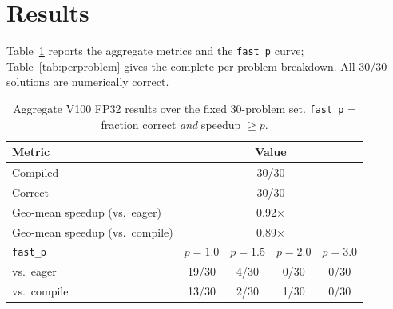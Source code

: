 \documentclass[conference]{IEEEtran}
\begin{document}
\section{Results}
Table~\ref{tab:aggregate} reports the aggregate metrics and the \texttt{fast\_p}
curve; Table~\ref{tab:perproblem} gives the complete per-problem breakdown. All
30/30 solutions are numerically correct.

\begin{table}[t]
\centering
\caption{Aggregate V100 FP32 results over the fixed 30-problem set.
\texttt{fast\_p} = fraction correct \emph{and} speedup $\ge p$.}
\label{tab:aggregate}
\begin{tabular}{lcccc}
\toprule
Metric & \multicolumn{4}{c}{Value} \\
\midrule
Compiled & \multicolumn{4}{c}{30/30} \\
Correct & \multicolumn{4}{c}{30/30} \\
Geo-mean speedup (vs.\ eager) & \multicolumn{4}{c}{0.92$\times$} \\
Geo-mean speedup (vs.\ compile) & \multicolumn{4}{c}{0.89$\times$} \\
\midrule
\texttt{fast\_p} & $p{=}1.0$ & $p{=}1.5$ & $p{=}2.0$ & $p{=}3.0$ \\
\midrule
vs.\ eager & 19/30 & 4/30 & 0/30 & 0/30 \\
vs.\ compile & 13/30 & 2/30 & 1/30 & 0/30 \\
\bottomrule
\end{tabular}
\end{table}
\end{document}
